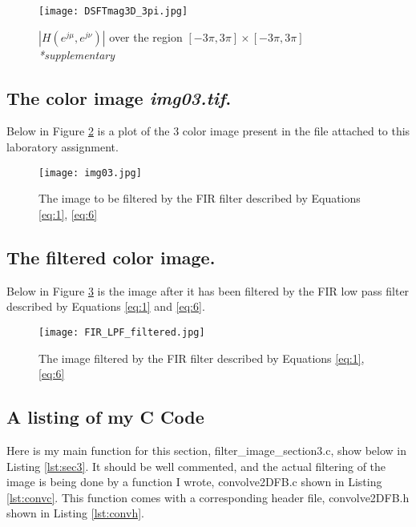 \documentclass{article}
\begin{document}
\begin{figure}[h]
    \centering
    \texttt{[image: DSFTmag3D\_3pi.jpg]}
    \caption{$|H(e^{j \mu}, e^{j \nu})|$ over the region $[-3\pi,3\pi] \times [-3\pi,3\pi]$ \textit{*supplementary}}
    \label{fig:2}
\end{figure}

\newpage
\subsection{The color image \textit{img03.tif}.}
Below in Figure \ref{fig:3} is a plot of the 3 color image present in the file attached to this laboratory assignment.

\begin{figure}[h]
    \centering
    \texttt{[image: img03.jpg]}
    \caption{The image to be filtered by the FIR filter described by Equations \ref{eq:1}, \ref{eq:6}}
    \label{fig:3}
\end{figure}

\newpage
\subsection{The filtered color image.}
Below in Figure \ref{fig:4} is the image after it has been filtered by the FIR low pass filter described by Equations \eqref{eq:1} and \eqref{eq:6}.
\begin{figure}[h]
    \centering
    \texttt{[image: FIR\_LPF\_filtered.jpg]}
    \caption{The image filtered by the FIR filter described by Equations \eqref{eq:1}, \eqref{eq:6}}
    \label{fig:4}
\end{figure}

\newpage
\subsection{A listing of my C Code}
Here is my main function for this section, filter\_image\_section3.c, show below in Listing \ref{lst:sec3}. It should be well commented, and the actual filtering of the image is being done by a function I wrote, convolve2DFB.c shown in Listing \ref{lst:convc}. This function comes with a corresponding header file, convolve2DFB.h shown in Listing \ref{lst:convh}.
\end{document}
